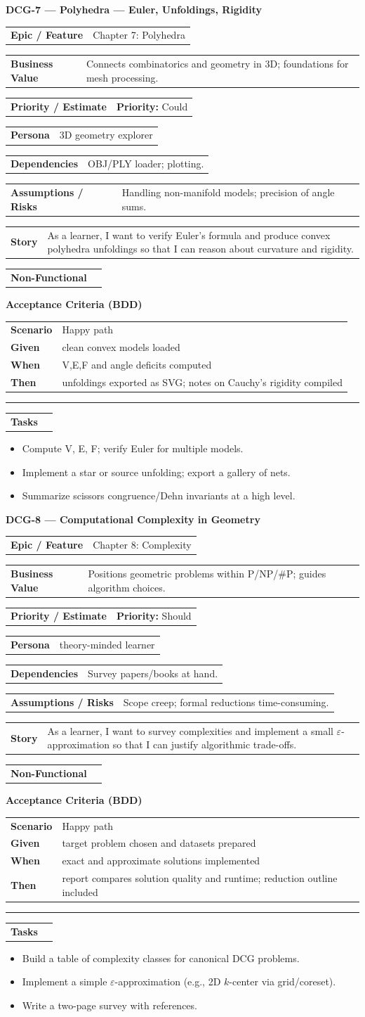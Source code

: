 \documentclass[11pt,a4paper]{article}
\makeatletter
\newcommand{\FieldRow}[2]{%
  \noindent\begin{tabularx}{\linewidth}{@{}>{\bfseries}l X@{}}#1 & #2\\\end{tabularx}%
}
\newcommand{\CardDivider}{\par\noindent\color{CardBorder}\rule{\linewidth}{0.4pt}\par\noindent\color{black}}
\newcommand{\StoryHeader}[2]{%
  {\large\bfseries \textcolor{CardTitle}{#1} --- #2}
}
\newcommand{\BDD}[4]{%
  \par\noindent\textbf{Acceptance Criteria (BDD)}\par\nobreak
  \noindent\begin{tabularx}{\linewidth}{@{}>{\bfseries}l X@{}}
  Scenario & #1\\
  Given & #2\\
  When & #3\\
  Then & #4\\
  \end{tabularx}\par
}
\newenvironment{TaskList}{%
  \begin{itemize}[leftmargin=1.25em,label=\(\square\)]
}{\end{itemize}}
\makeatother
\begin{document}
\begin{StoryCardBox}
\StoryHeader{DCG-7}{Polyhedra — Euler, Unfoldings, Rigidity}\\[0.4em]
\FieldRow{Epic / Feature}{Chapter 7: Polyhedra}
\FieldRow{Business Value}{Connects combinatorics and geometry in 3D; foundations for mesh processing.}
\FieldRow{Priority / Estimate}{\textbf{Priority:} Could \quad \nfchip{SP: 5}}
\FieldRow{Persona}{3D geometry explorer}
\FieldRow{Dependencies}{OBJ/PLY loader; plotting.}
\FieldRow{Assumptions / Risks}{Handling non-manifold models; precision of angle sums.}
\FieldRow{Story}{As a learner, I want to verify Euler's formula and produce convex polyhedra unfoldings so that I can reason about curvature and rigidity.}

\FieldRow{Non-Functional}{\nfchip{Rigor} \nfchip{Clarity} \nfchip{Reproducibility}}

\BDD{Happy path}{clean convex models loaded}{V,E,F and angle deficits computed}{unfoldings exported as SVG; notes on Cauchy's rigidity compiled}

\CardDivider
\FieldRow{\large Tasks}{}
\begin{TaskList}
  \item Compute V, E, F; verify Euler for multiple models.
  \item Implement a star or source unfolding; export a gallery of nets.
  \item Summarize scissors congruence/Dehn invariants at a high level.
\end{TaskList}
\end{StoryCardBox}

\begin{StoryCardBox}
\StoryHeader{DCG-8}{Computational Complexity in Geometry}\\[0.4em]
\FieldRow{Epic / Feature}{Chapter 8: Complexity}
\FieldRow{Business Value}{Positions geometric problems within P/NP/\#P; guides algorithm choices.}
\FieldRow{Priority / Estimate}{\textbf{Priority:} Should \quad \nfchip{SP: 3}}
\FieldRow{Persona}{theory-minded learner}
\FieldRow{Dependencies}{Survey papers/books at hand.}
\FieldRow{Assumptions / Risks}{Scope creep; formal reductions time-consuming.}
\FieldRow{Story}{As a learner, I want to survey complexities and implement a small $\varepsilon$-approximation so that I can justify algorithmic trade-offs.}

\FieldRow{Non-Functional}{\nfchip{Rigor} \nfchip{Clarity} \nfchip{Reproducibility}}

\BDD{Happy path}{target problem chosen and datasets prepared}{exact and approximate solutions implemented}{report compares solution quality and runtime; reduction outline included}

\CardDivider
\FieldRow{\large Tasks}{}
\begin{TaskList}
  \item Build a table of complexity classes for canonical DCG problems.
  \item Implement a simple $\varepsilon$-approximation (e.g., 2D $k$-center via grid/coreset).
  \item Write a two-page survey with references.
\end{TaskList}
\end{StoryCardBox}
\end{document}
